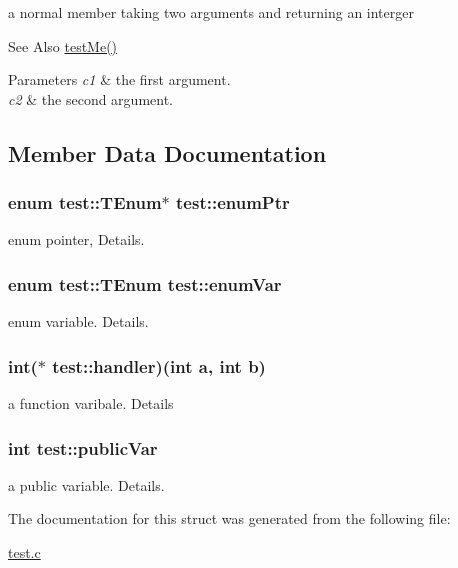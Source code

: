 a normal member taking two arguments and returning an interger \begin{DoxySeeAlso}{See Also}
\hyperlink{structtest_a327710fadd5e4f9a81c27151db774166}{test\-Me()} 
\end{DoxySeeAlso}

\begin{DoxyParams}{Parameters}
{\em c1} & the first argument. \\
\hline
{\em c2} & the second argument. \\
\hline
\end{DoxyParams}


\subsection{Member Data Documentation}
\hypertarget{structtest_acdaa5472c4df0e16372e50f459a9373d}{
\subsubsection[{enum\-Ptr}]{\setlength{\rightskip}{0pt plus 5cm}enum {\bf test\-::\-T\-Enum}$\ast$ test\-::enum\-Ptr}}\label{structtest_acdaa5472c4df0e16372e50f459a9373d}
enum pointer, Details. \hypertarget{structtest_aa14105cde7beb48b81ad15d1acc827a6}{
\subsubsection[{enum\-Var}]{\setlength{\rightskip}{0pt plus 5cm}enum {\bf test\-::\-T\-Enum}
	 test\-::enum\-Var}}\label{structtest_aa14105cde7beb48b81ad15d1acc827a6}
enum variable. Details. \hypertarget{structtest_a6dad6fe8d3d6a694ec4d2789843e22b3}{
\subsubsection[{handler}]{\setlength{\rightskip}{0pt plus 5cm}int($\ast$ test\-::handler)(int a, int b)}}\label{structtest_a6dad6fe8d3d6a694ec4d2789843e22b3}
a function varibale. Details \hypertarget{structtest_a8ec0a84242379c5ac349646057e13d20}{
\subsubsection[{public\-Var}]{\setlength{\rightskip}{0pt plus 5cm}int test\-::public\-Var}}\label{structtest_a8ec0a84242379c5ac349646057e13d20}
a public variable. Details. 

The documentation for this struct was generated from the following file\-:\begin{DoxyCompactItemize}
\item 
\hyperlink{test_8c}{test.\-c}\end{DoxyCompactItemize}
